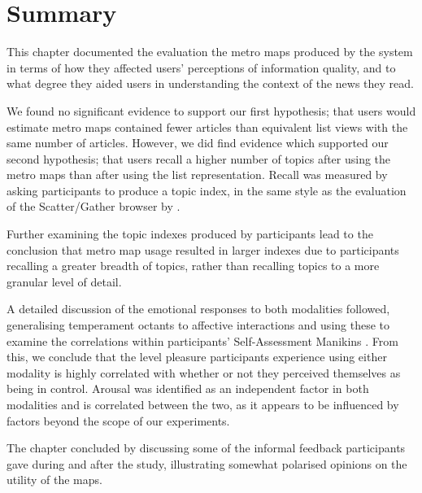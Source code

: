 \section{Summary}

This chapter documented the evaluation the metro maps produced by the system in terms of how they affected users' perceptions of information quality, and to what degree they aided users in understanding the context of the news they read.

We found no significant evidence to support our first hypothesis; that users would estimate metro maps contained fewer articles than equivalent list views with the same number of articles. However, we did find evidence which supported our second hypothesis; that users recall a higher number of topics after using the metro maps than after using the list representation. Recall was measured by asking participants to produce a topic index, in the same style as the evaluation of the Scatter/Gather browser by \cite{scattergather}.

Further examining the topic indexes produced by participants lead to the conclusion that metro map usage resulted in larger indexes due to participants recalling a greater breadth of topics, rather than recalling topics to a more granular level of detail.

A detailed discussion of the emotional responses to both modalities followed, generalising  temperament octants to affective interactions and using these to examine the correlations within participants' Self-Assessment Manikins \citep{measuringemotion}. From this, we conclude that the level pleasure participants experience using either modality is highly correlated with whether or not they perceived themselves as being in control. Arousal was identified as an independent factor in both modalities and is correlated between the two, as it appears to be influenced by factors beyond the scope of our experiments.

The chapter concluded by discussing some of the informal feedback participants gave during and after the study, illustrating somewhat polarised opinions on the utility of the maps.